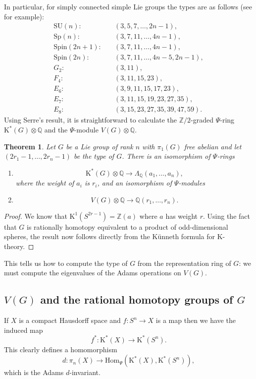 \documentclass[twoside,a4paper,reqno,11pt]{amsart}
\newtheorem{theorem}[lemma]{Theorem}
\newcommand{\K}{\mathrm{K}}
\newcommand{\Q}{\mathbb{Q}}
\newcommand{\Z}{\mathbb{Z}}
\renewcommand{\o}{\otimes}
\newcommand{\SU}{\mathrm{SU}}
\newcommand{\Hom}{\mathrm{Hom}}
\newcommand{\Spin}{\mathrm{Spin}}
\newcommand{\Sp}{\mathrm{Sp}}
\begin{document}
In particular, for simply connected simple Lie groups the types are as follows (see \cite[p.11, p.14]{MR45129} for example): 
\begin{align*}
\SU(n):  \quad &  (3,5,7, \dots , 2n-1),\\
\Sp(n): \quad & (3,7,11, \dots , 4n-1),\\
\Spin(2n+1): \quad & (3,7,11, \dots , 4n-1),\\
\Spin(2n): \quad & (3,7,11, \dots , 4n-5, 2n-1),\\
G_2: \quad & (3,11),\\
F_4: \quad & (3,11,15,23),\\
E_6: \quad & (3,9,11,15,17,23),\\
E_7: \quad & (3,11,15,19,23,27,35),\\
E_8: \quad & (3,15,23,27,35,39,47,59).
\end{align*}
Using Serre's result, it is straightforward to calculate the $\Z/2$-graded $\Psi$-ring $\K^*(G)\o\Q$ and the $\Psi$-module $V(G)\o \Q$. 

\begin{theorem} \label{thm:isoswithtype}
Let $G$ be a Lie group of rank $n$ with $\pi_1(G)$ free abelian and let $(2r_1-1, \dots, 2r_n-1)$ be the type of $G$. 
There is an isomorphism of $\Psi$-rings 
\begin{enumerate}
\item \[ \K^*(G)\o \Q \to \Lambda_{\Q}(a_1, \dots, a_n),\]
where the weight of $a_i$ is $r_i$, and an isomorphism of $\Psi$-modules 
\item \[ V(G)\o \Q \to \Q(r_1, \dots, r_n).\]
\end{enumerate}
\end{theorem}
\begin{proof}
We know that $\K^1(S^{2r-1}) = \Z(a)$ where $a$ has weight $r$. Using the fact that $G$ is rationally homotopy equivalent to a product of odd-dimensional spheres, the result now follows directly from the K\"unneth formula for $\K$-theory.
\end{proof}

This tells us how to compute the type of $G$ from the representation ring of $G$: we must compute the eigenvalues of the Adams operations on $V(G)$.

\subsection{$V(G)$ and the rational homotopy groups of $G$}
If $X$ is a compact Hausdorff space and $f : S^n \to X$ is a map then we have the induced map
\[ f^* : \K^*(X) \to \K^*(S^n). \]
This clearly defines a homomorphism
\[ d : \pi_n(X) \to \Hom_{\Psi}(\K^*(X), \K^*(S^n)), \]
which is the Adams $d$-invariant.
\end{document}
